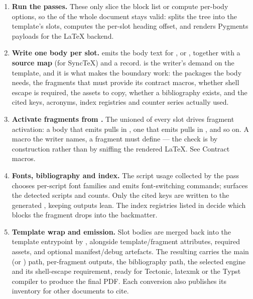 \documentclass[a4paper,twoside]{article}
\begin{document}
\begin{enumerate}
resolved label: \enquote{Figure 3}, \enquote{FW-01}, a citation key, a glossary entry, a
cross-document inventory hit. Resolution happens \textbf{once}, over the whole
document, so numbering is consistent across slots and unresolved references
are reported with their span instead of silently disappearing.
\item \textbf{Run the  passes.}
These only slice the block list or compute per-body options, so the
 of the whole document stays valid:  splits the tree into
the template's slots,  computes the per-slot heading offset, and
 renders Pygments payloads for the \LaTeX{} backend.
\item \textbf{Write one body per slot.}
 emits the body text for ,  or
, together with a \textbf{source map} (for SyncTeX) and a 
record.  is the writer's demand on the template, and it is what
makes the boundary work: the packages the body needs, the  fragments
that must provide its contract macros, whether shell escape is required, the
assets to copy, whether a bibliography exists, and the cited keys, acronyms,
index registries and counter series actually used.
\item \textbf{Activate fragments from .}
The unioned  of every slot drives fragment activation: a body that
emits  pulls in , one that emits  pulls in
, and so on. A macro the writer names, a fragment must define --- the
check is by construction rather than by sniffing the rendered \LaTeX{}. See
Contract macros.
\item \textbf{Fonts, bibliography and index.}
The script usage collected by the  pass chooses per-script font
families and emits font-switching commands;  surfaces the
detected scripts and counts. Only the cited keys are written to the
generated , keeping outputs lean. The index
registries listed in  decide which  blocks the
 fragment drops into the backmatter.
\item \textbf{Template wrap and emission.}
Slot bodies are merged back into the template entrypoint by
, alongside template/fragment attributes, required
assets, and optional manifest/debug artefacts. The resulting
 carries the main  (or ) path, per-fragment
outputs, the bibliography path, the selected engine and its shell-escape
requirement, ready for Tectonic, latexmk or the Typst compiler to produce the
final PDF. Each conversion also publishes its 
inventory for other documents to cite.
\end{enumerate}
\end{document}
